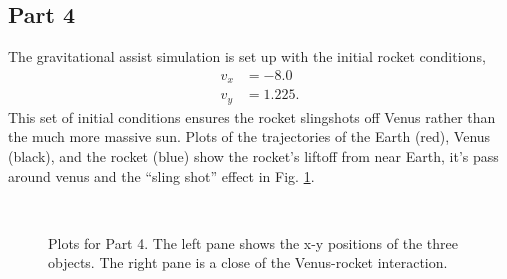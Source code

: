 \documentclass[singlepage,notitlepage,nofootinbib,11pt]{revtex4-1}
\begin{document}
\subsection{Part 4}
The gravitational assist simulation is set up with the initial rocket conditions,
\begin{align*}
v_x &= -8.0 \\
v_y &= 1.225.
\end{align*}
This set of initial conditions ensures the rocket slingshots off Venus rather than the much more massive sun. Plots of the trajectories of the Earth (red), Venus (black), and the rocket (blue) show the rocket's liftoff from near Earth, it's pass around venus and the ``sling shot'' effect in Fig. \ref{fig4}.
\begin{figure}[h]
  \centering
  \\
\hfill
  \caption{\label{fig4} Plots for Part 4. The left pane shows the x-y positions of the three objects. The right pane is a close of the Venus-rocket interaction.}
\end{figure}
\clearpage
\end{document}
